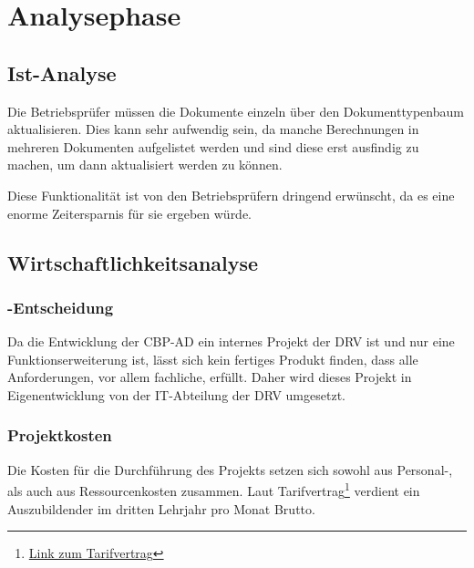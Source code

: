 
\newpage
\section{Analysephase} 
\label{sec:Analysephase}


\subsection{Ist-Analyse} 
\label{sec:IstAnalyse}

Die Betriebsprüfer müssen die Dokumente einzeln über den Dokumenttypenbaum aktualisieren. Dies kann sehr aufwendig sein, da manche Berechnungen in mehreren Dokumenten aufgelistet werden und sind diese erst ausfindig zu machen, um dann aktualisiert werden zu können.

Diese Funktionalität ist von den Betriebsprüfern dringend erwünscht, da es eine enorme Zeitersparnis für sie ergeben würde.
\subsection{Wirtschaftlichkeitsanalyse}
\label{sec:Wirtschaftlichkeitsanalyse}

\subsubsection{-Entscheidung}
\label{sec:MakeOrBuyEntscheidung}

Da die Entwicklung der \acs{CBP-AD} ein internes Projekt der \acs{DRV} ist und nur eine Funktionserweiterung ist, lässt sich kein fertiges Produkt finden, dass alle Anforderungen, vor allem fachliche, erfüllt. Daher wird dieses Projekt in Eigenentwicklung von der IT-Abteilung der \acs{DRV} umgesetzt.

\subsubsection{Projektkosten}
\label{sec:Projektkosten}

Die Kosten für die Durchführung des Projekts setzen sich sowohl aus Personal-, als auch aus Ressourcenkosten zusammen.
Laut Tarifvertrag\footnote{\href{http://www.oeffentlichen-dienst.de/auszubildende/25-tarifvertrag-fuer-den-auszubildende/90-tvaoed-besonderer-teil-bbig.html}{Link zum Tarifvertrag}} verdient ein Auszubildender im dritten Lehrjahr pro Monat  Brutto. 

